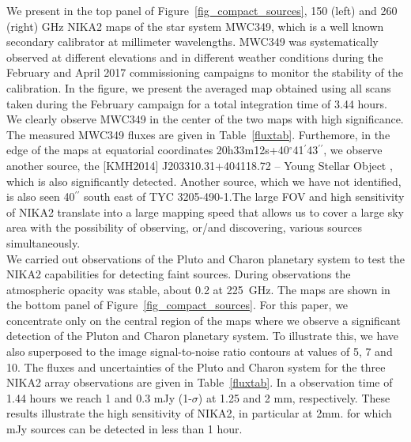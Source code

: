 \documentclass[]{aa} %
\begin{document}
We present in the top panel of Figure~\ref{fig_compact_sources}, 150 (left) and 260 (right) GHz NIKA2 maps of the star system MWC349, which is a well known secondary calibrator at millimeter wavelengths. MWC349 was systematically observed at different elevations and in different weather conditions during the February and April 2017 commissioning campaigns to monitor the stability of the calibration. In the figure, we present the averaged map obtained using all scans taken during the February
campaign for a total integration time of 3.44 hours. We clearly observe MWC349 in the center of the two maps with high significance. The measured MWC349 fluxes are given in Table~\ref{fluxtab}. Furthemore, in the edge of the maps at equatorial coordinates 20h33m12s+40$^{\circ}$41$^{\prime}$43$^{\prime \prime}$, we observe another source, the [KMH2014] J203310.31+404118.72 -- Young Stellar Object , which is also significantly detected. Another source, which we have not identified, is also seen 40$^{\prime \prime}$ south east of TYC 3205-490-1.The large FOV and high sensitivity of NIKA2 translate into a large mapping speed that allows us to cover a large sky area with the possibility of observing, or/and discovering, various sources simultaneously. \\

We carried out observations of the Pluto and Charon planetary system to test the NIKA2 capabilities for detecting faint sources. 
During observations the atmospheric opacity was stable, about 0.2 at 225~GHz.
The maps are shown in the bottom panel of Figure~\ref{fig_compact_sources}. For this paper, we concentrate only on the central region of the maps where we observe a significant detection of the Pluton and Charon planetary system. To illustrate this, we have also superposed to the image signal-to-noise ratio contours at values of 5, 7 and 10. The fluxes and uncertainties of the Pluto and Charon system for the three NIKA2 array observations are given in Table~\ref{fluxtab}. In a observation time of 1.44 hours we reach 1 and 0.3 mJy (1-$\sigma$) at 1.25 and 2 mm, respectively.
These results illustrate the high sensitivity of NIKA2, in particular at 2mm. for which mJy sources can be detected in less than 1 hour.



%
%
\end{document}
